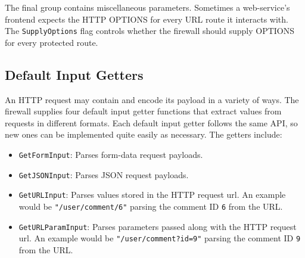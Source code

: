 
The final group contains miscellaneous parameters. Sometimes a web-service's frontend expects the HTTP OPTIONS for every URL route it interacts with. The \lstinline{SupplyOptions} flag controls whether the firewall should supply OPTIONS for every protected route.








\subsection{Default Input Getters}\label{Sec:DefaultInputGetters}

An HTTP request may contain and encode its payload in a variety of ways. The firewall supplies four default input getter functions that extract values from requests in different formats. Each default input getter follows the same API, so new ones can be implemented quite easily as necessary. The getters include:

\begin{itemize}[nosep]
\item \lstinline{GetFormInput}: Parses form-data request payloads.

\item \lstinline{GetJSONInput}: Parses JSON request payloads.

\item \lstinline{GetURLInput}: Parses values stored in the HTTP request url. An example would be \lstinline{"/user/comment/6"} parsing the comment ID \lstinline{6} from the URL.

\item \lstinline{GetURLParamInput}: Parses parameters passed along with the HTTP request url. An example would be \lstinline{"/user/comment?id=9"} parsing the comment ID \lstinline{9} from the URL.

\end{itemize}

